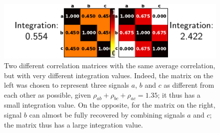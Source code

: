 \documentclass[5p]{elsarticle}
\begin{document}
\begin{figure}
\includegraphics[width=\linewidth]{pg_0006}

\caption{Two different correlation matrices with the same average
correlation, but with very different integration values. Indeed, the
matrix on the left was chosen to represent three signals $a$, $b$
and $c$ as different from each other as possible, given $\rho_{ab} +
\rho_{bc} + \rho_{ac} = 1.35$; it thus has a small integration value. On
the opposite, for the matrix on the right, signal $b$ can almost be fully
recovered by combining signals $a$ and $c$; the matrix thus has a large
integration value.
\label{fig:integration}}
\end{figure}
\end{document}
